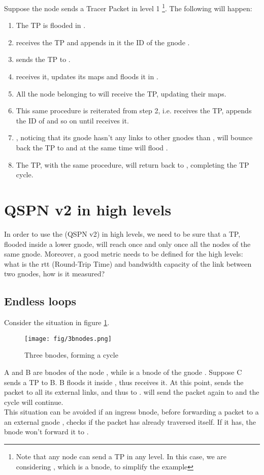 \documentclass[a4paper]{article}
\begin{document}
Suppose the node  sends a Tracer Packet in level 1 
\footnote{Note that any node can send a TP in any level. In this case, we are
considering , which is a bnode, to simplify the example}. 
The following will happen:
\begin{enumerate}
	\item The TP is flooded in .
	\item  receives the TP and appends in it the ID of the gnode
		.
	\item  sends the TP to .
	\item  receives it, updates its maps and floods it in .
	\item All the node belonging to  will receive the TP, updating their
		maps.
	\item This same procedure is reiterated from step 2, i.e.  receives
		the TP, appends the ID of  and so on until  receives
		it.
	\item , noticing that its gnode hasn't any links to other gnodes
		than , will bounce back the TP to  and at the same
		time will flood .
	\item The TP, with the same procedure, will return back to ,
		completing the TP cycle.
\end{enumerate}

\section{QSPN v2 in high levels}
In order to use the  (QSPN v2) in high levels, we need to be sure that a TP,
flooded inside a lower gnode, will reach once and only once all the nodes of
the same gnode. Moreover, a good metric needs to be defined for the high
levels: what is the rtt (Round-Trip Time) and bandwidth capacity of the link
between two gnodes, how is it measured?

\subsection{Endless loops}
Consider the situation in figure \ref{fig:3bnodes}.
\begin{figure}[h]
	\begin{center}
		\texttt{[image: fig/3bnodes.png]}
	\end{center}
	\caption{Three bnodes, forming a cycle}
	\label{fig:3bnodes}
\end{figure}
A and B are bnodes of the node , while  is a bnode of the gnode .
Suppose C sends a TP to B. B floods it inside , thus  receives it. At
this point,  sends the packet to all its external links, and thus to .
 will send the packet again to  and the cycle will continue.\\
\newline
This situation can be avoided if an ingress bnode, before forwarding a packet to a an
external gnode , checks if the packet has already traversed  itself. If
it has, the bnode won't forward it to .
\end{document}
